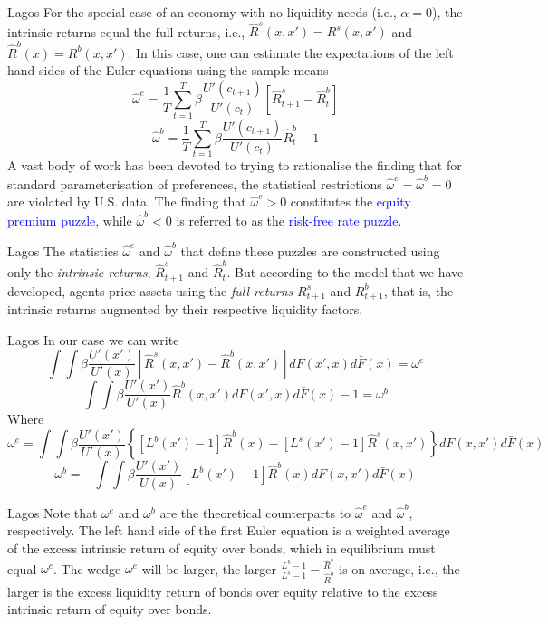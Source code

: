 \documentclass[aspectratio=169,xcolor=dvipsnames]{beamer}
\begin{document}
\begin{frame}{Lagos}
    For the special case of an economy with no liquidity needs (i.e., $\alpha = 0$), the intrinsic returns equal the full returns, i.e., $\hat R^s(x, x') = R^s(x, x')$ and $\hat R^b(x) = R^b(x, x')$. In this case, one can estimate the expectations of the left hand sides of the Euler equations using the sample means
    \[
        \hat \omega^e = \frac{1}{T} \sum_{t=1}^T \beta \frac{U'(c_{t+1})}{U'(c_t)} [\hat R^s_{t+1} - \hat R^b_t]
    \]
    \[
        \hat \omega^b = \frac{1}{T} \sum_{t=1}^T \beta \frac{U'(c_{t+1})}{U'(c_t)} \hat R^b_t - 1
    \]
    A vast body of work has been devoted to trying to rationalise the finding that for standard parameterisation of preferences, the statistical restrictions $\hat \omega^e = \hat \omega^b = 0$ are violated by U.S. data. The finding that $\hat \omega^e > 0$ constitutes the \textcolor{blue}{equity premium puzzle}, while $\hat \omega^b < 0$ is referred to as the \textcolor{blue}{risk-free rate puzzle}.
\end{frame}

\begin{frame}{Lagos}
    The statistics $\hat \omega^e$ and $\hat \omega^b$ that define these puzzles are constructed using only the \emph{intrinsic returns}, $\hat R^s_{t+1}$ and $\hat R^b_t$. But according to the model that we have developed, agents price assets using the \emph{full returns} $R^s_{t+1}$ and $R^b_{t+1}$, that is, the intrinsic returns augmented by their respective liquidity factors.
\end{frame}

\begin{frame}{Lagos}
    In our case we can write
    \[
        \int \int \beta \frac{U'(x')}{U'(x)} [\hat R^s(x, x') - \hat R^b(x, x')] dF(x', x) d\bar F(x) = \omega^e
    \]
    \[
        \int \int \beta \frac{U'(x')}{U'(x)} \hat R^b(x, x') dF(x', x) d\bar F(x) - 1 = \omega^b
    \]
    Where
    \[
        \omega^e = \int \int \beta \frac{U'(x')}{U'(x)} \left\{ [L^b(x') - 1] \hat R^b(x) - [L^s(x') - 1] \hat R^s(x, x')\right\} dF(x, x') d\bar F(x)
    \]
    \[
        \omega^b = -\int \int \beta \frac{U'(x')}{U(x)} [L^b(x') - 1] \hat R^b(x) dF(x, x') d\bar F(x)
    \]
\end{frame}

\begin{frame}{Lagos}
    Note that $\omega^e$ and $\omega^b$ are the theoretical counterparts to $\hat \omega^e$ and $\hat \omega^b$, respectively. The left hand side of the first Euler equation is a weighted average of the excess intrinsic return of equity over bonds, which in equilibrium must equal $\omega^e$. The wedge $\omega^e$ will be larger, the larger $\frac{L^b - 1}{L^s - 1} - \frac{\hat R^s}{\hat R^b}$ is on average, i.e., the larger is the excess liquidity return of bonds over equity relative to the excess intrinsic return of equity over bonds.
\end{frame}
\end{document}
